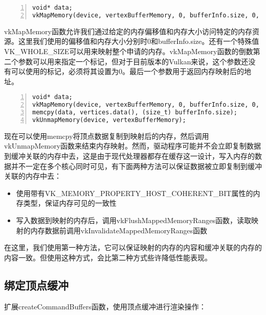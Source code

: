 \documentclass{ctexart}
\begin{document}
\begin{lstlisting}[language={[ANSI]C},keywordstyle=\color{blue!70},commentstyle=\color{red!50!green!50!blue!50},frame=shadowbox, rulesepcolor=\color{red!20!green!20!blue!20},basicstyle=\small,numbers=left, numberstyle=\tiny,breaklines=true]
void* data;
vkMapMemory(device, vertexBufferMemory, 0, bufferInfo.size, 0, &data);
\end{lstlisting}

vkMapMemory函数允许我们通过给定的内存偏移值和内存大小访问特定的内存资源。这里我们使用的偏移值和内存大小分别时0和bufferInfo.size。还有一个特殊值VK\_WHOLE\_SIZE可以用来映射整个申请的内存。vkMapMemory函数的倒数第二个参数可以用来指定一个标记，但对于目前版本的Vulkan来说，这个参数还没有可以使用的标记，必须将其设置为0。最后一个参数用于返回内存映射后的地址。

\begin{lstlisting}[language={[ANSI]C},keywordstyle=\color{blue!70},commentstyle=\color{red!50!green!50!blue!50},frame=shadowbox, rulesepcolor=\color{red!20!green!20!blue!20},basicstyle=\small,numbers=left, numberstyle=\tiny,breaklines=true]
void* data;
vkMapMemory(device, vertexBufferMemory, 0, bufferInfo.size, 0, &data);
memcpy(data, vertices.data(), (size_t) bufferInfo.size);
vkUnmapMemory(device, vertexBufferMemory);
\end{lstlisting}

现在可以使用memcpy将顶点数据复制到映射后的内存，然后调用vkUnmapMemory函数来结束内存映射。然而，驱动程序可能并不会立即复制数据到缓冲关联的内存中去，这是由于现代处理器都存在缓存这一设计，写入内存的数据并不一定在多个核心同时可见，有下面两种方法可以保证数据被立即复制到缓冲关联的内存中去：

\begin{itemize}
	\item 使用带有VK\_MEMORY\_PROPERTY\_HOST\_COHERENT\_BIT属性的内存类型，保证内存可见的一致性
	\item 写入数据到映射的内存后，调用vkFlushMappedMemoryRanges函数，读取映射的内存数据前调用vkInvalidateMappedMemoryRanges函数
\end{itemize}

在这里，我们使用第一种方法，它可以保证映射的内存的内容和缓冲关联的内存的内容一致。但使用这种方式，会比第二种方式些许降低性能表现。

\subsection{绑定顶点缓冲}

扩展createCommandBuffers函数，使用顶点缓冲进行渲染操作：
\end{document}
